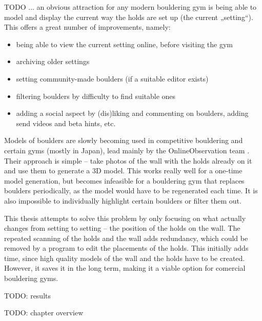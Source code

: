

TODO ... an obvious attraction for any modern bouldering gym is being able to model and display the current way the holds are set up (the current „setting“). This offers a great number of improvements, namely:

\begin{itemize}
\item being able to view the current setting online, before visiting the gym
\item archiving older settings
\item setting community-made boulders (if a suitable editor exists)
\item filtering boulders by difficulty to find suitable ones
\item adding a social aspect by (dis)liking and commenting on boulders, adding send videos and beta hints, etc.
\end{itemize}

Models of boulders are slowly becoming used in competitive bouldering and certain gyms (mostly in Japan), lead mainly by the OnlineObservation team \cite{onlineobservation}. Their approach is simple -- take photos of the wall with the holds already on it and use them to generate a 3D model. This works really well for a one-time model generation, but becomes infeasible for a bouldering gym that replaces boulders periodically, as the model would have to be regenerated each time. It is also impossible to individually highlight certain boulders or filter them out.

This thesis attempts to solve this problem by only focusing on what actually changes from setting to setting -- the position of the holds on the wall. The repeated scanning of the holds and the wall adds redundancy, which could be removed by a program to edit the placements of the holds. This initially adds time, since high quality models of the wall and the holds have to be created. However, it saves it in the long term, making it a viable option for comercial bouldering gyms.

TODO: results

TODO: chapter overview

